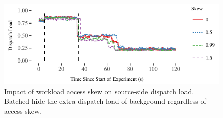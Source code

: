 \begin{figure}[t]
\centering
\includegraphics[width=1.0\columnwidth]{graphs/priopull-skew}
\caption{Impact of workload access skew on source-side dispatch load. Batched
  \priopulls hide the extra dispatch load of background \pulls regardless of
  access skew.}
\label{fig:load-skew}
\end{figure}
